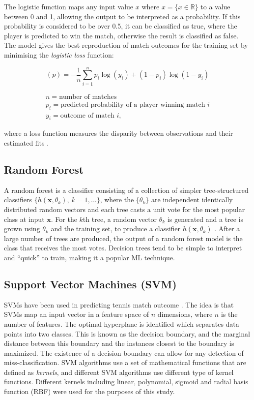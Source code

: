 The logistic function maps any input value $x$ where $x = \{x\in \mathbb{R} \}$ to a value between 0 and 1, allowing the output to be interpreted as a probability. If this probability is considered to be over 0.5, it can be classified as true, where the player is predicted to win the match, otherwise the result is classified as false. The model gives the best reproduction of match outcomes for the training set by minimising the \textit{logistic loss} function:

\begin{equation}
    (p) = -\frac{1}{n} \sum_{i=1}^n p_i \log(y_i) + (1-p_i)\log(1-y_i)
\end{equation}

$$
\begin{gathered}
    n = \text{number of matches} \\
    p_i = \text{predicted probability of a player winning match $i$} \\
    y_i = \text{outcome of match $i$},
\end{gathered}
$$

where a loss function measures the disparity between observations and their estimated fits \cite{hazan2014logistic}.

\subsection{Random Forest}
A random forest is a classifier consisting of a collection of simpler tree-structured classifiers $\{h(\textbf{x},\theta_k),\ k=1,...\}$, where the $\{\theta_k\}$ are independent identically distributed random vectors and each tree casts a unit vote for the most popular class at input $\textbf{x}$. For the $k$th tree, a random vector $\theta_k$ is generated and a tree is grown using $\theta_k$ and the training set, to produce a classifier $h(\textbf{x}, \theta_k)$ \cite{breiman2001random}. After a large number of trees are produced, the output of a random forest model is the class that receives the most votes. Decision trees tend to be simple to interpret and ``quick'' to train, making it a popular ML technique.

\subsection{Support Vector Machines (SVM)}
SVMs have been used in predicting tennis match outcome \cite{cornman2017machine}. The idea is that SVMs map an input vector in a feature space of $n$ dimensions, where $n$ is the number of features. The optimal hyperplane is identified which separates data points into two classes. This is known as the decision boundary, and the marginal distance between this boundary and the instances closest to the boundary is maximized. The existence of a decision boundary can allow for any detection of miss-classification. SVM algorithms use a set of mathematical functions that are defined as \textit{kernels}, and different SVM algorithms use different type of kernel functions. Different kernels including linear, polynomial, sigmoid and radial basis function (RBF) were used for the purposes of this study.

